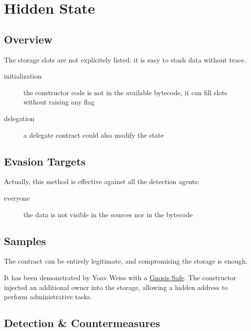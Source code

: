 \section{Hidden State}

\subsection{Overview}

The storage slots are not explicitely listed: it is easy to stash data without trace.

\begin{description}
\item[initialization]{the constructor code is not in the available bytecode, it can fill slots without raising any flag}
\item[delegation]{a delegate contract could also modify the state}
\end{description}

\subsection{Evasion Targets}

Actually, this method is effective against all the detection agents:

\begin{description}
\item[everyone]{the data is not visible in the sources nor in the bytecode}
\end{description}

\subsection{Samples}

The contract can be entirely legitimate, and compromising the storage is enough.

It has been demonstrated by Yoav Weiss \cite{video-masquerading-code} with a \href{https://github.com/safe-global/safe-contracts}{Gnosis Safe}.
The constructor injected an additional owner into the storage, allowing a hidden address to perform administrative tasks.

\subsection{Detection \& Countermeasures}

\begin{description}
\item[]{}
\end{description}
